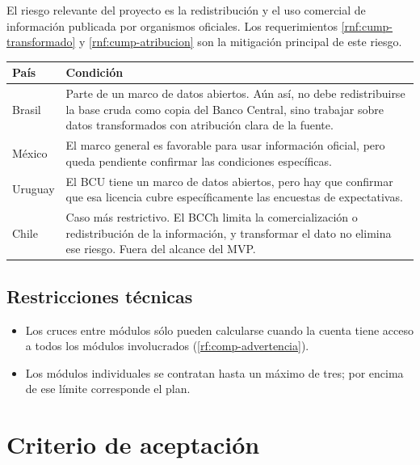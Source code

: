 \documentclass[11pt,a4paper]{article}
\begin{document}
El riesgo relevante del proyecto es la redistribuci\'on y el uso comercial de
informaci\'on publicada por organismos oficiales. Los requerimientos
\ref{rnf:cump-transformado} y \ref{rnf:cump-atribucion} son la mitigaci\'on
principal de este riesgo.

\begin{tabularx}{\textwidth}{l X}
\toprule
\textbf{Pa\'is} & \textbf{Condici\'on} \\
\midrule
Brasil &
Parte de un marco de datos abiertos. A\'un as\'i, no debe redistribuirse la base
cruda como copia del Banco Central, sino trabajar sobre datos transformados con
atribuci\'on clara de la fuente. \\
\addlinespace
M\'exico &
El marco general es favorable para usar informaci\'on oficial, pero queda
pendiente confirmar las condiciones espec\'ificas. \\
\addlinespace
Uruguay &
El BCU tiene un marco de datos abiertos, pero hay que confirmar que esa licencia
cubre espec\'ificamente las encuestas de expectativas. \\
\addlinespace
Chile &
Caso m\'as restrictivo. El BCCh limita la comercializaci\'on o redistribuci\'on
de la informaci\'on, y transformar el dato no elimina ese riesgo. Fuera del
alcance del MVP. \\
\bottomrule
\end{tabularx}

\subsection{Restricciones t\'ecnicas}

\begin{itemize}
  \item Los cruces entre m\'odulos s\'olo pueden calcularse cuando la cuenta
        tiene acceso a todos los m\'odulos involucrados (\ref{rf:comp-advertencia}).
  \item Los m\'odulos individuales se contratan hasta un m\'aximo de tres; por
        encima de ese l\'imite corresponde el plan.
\end{itemize}

\section{Criterio de aceptaci\'on}
\end{document}
